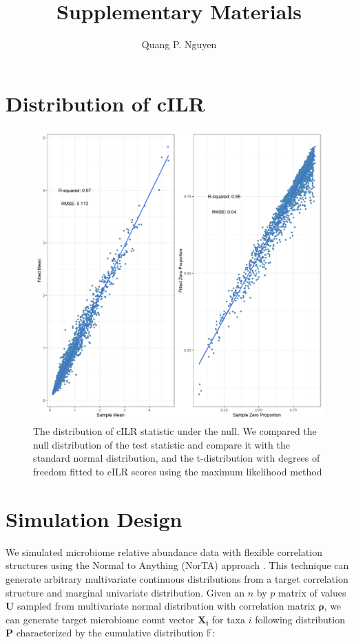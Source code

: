 \documentclass{article}
\author{Quang P. Nguyen}
\title{Supplementary Materials}
\begin{document}
\maketitle
{}

\section{Distribution of cILR}
\begin{figure}[h]
    \centering
    \includegraphics[width=0.8\linewidth]{figures/HMP_fit_evaluation.png}
    \caption{The distribution of cILR statistic under the null. We compared the null distribution of the test statistic and compare it with the standard normal distribution, and the t-distribution with degrees of freedom fitted to cILR scores using the maximum likelihood method}
\end{figure}

\section{Simulation Design} 

We simulated microbiome relative abundance data with flexible correlation structures using the Normal to Anything (NorTA) approach \cite{cario}. This technique can generate arbitrary multivariate continuous distributions from a target correlation structure and marginal univariate distribution. Given an $n$ by $p$ matrix of values $\mathbf{U}$ sampled from multivariate normal distribution with correlation matrix $\mathbf{\rho}$, we can generate target microbiome count vector $\mathbf{X_i}$ for taxa $i$ following distribution $\mathbf{P}$ characterized by the cumulative distribution $\mathbb{F}$:
\end{document}
